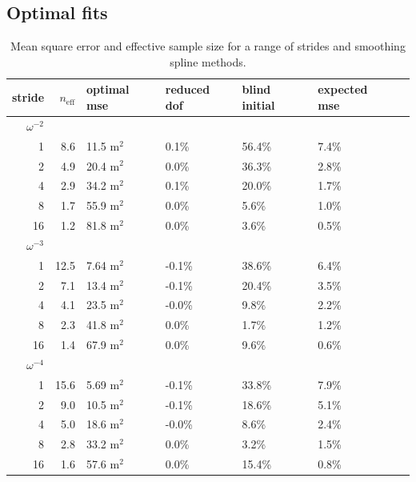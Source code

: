 \documentclass{ametsoc}
\begin{document}
\subsection{Optimal fits} \label{optimal_fits}
\begin{table}[ht]
\caption{Mean square error and effective sample size for a range of strides and smoothing spline methods. 
}
\label{fit_results_gaussian}
\centering
\begin{tabular}{r r p{1cm} | p{1cm}p{1cm}p{1cm}p{1cm}} stride & $n_\textrm{eff}$ & optimal mse & reduced dof & blind initial & expected mse \\ \hline \hline 
$\omega^{-2}$ &&&&&  \\ \hline 
1 & 8.6 & 11.5 m$^2$ &  0.1\%  &  56.4\%  &  7.4\%  \\ 
2 & 4.9 & 20.4 m$^2$ &  0.0\%  &  36.3\%  &  2.8\%  \\ 
4 & 2.9 & 34.2 m$^2$ &  0.1\%  &  20.0\%  &  1.7\%  \\ 
8 & 1.7 & 55.9 m$^2$ &  0.0\%  &  5.6\%  &  1.0\%  \\ 
16 & 1.2 & 81.8 m$^2$ &  0.0\%  &  3.6\%  &  0.5\%  \\ 
$\omega^{-3}$ &&&&&  \\ \hline 
1 & 12.5 & 7.64 m$^2$ &  -0.1\%  &  38.6\%  &  6.4\%  \\ 
2 & 7.1 & 13.4 m$^2$ &  -0.1\%  &  20.4\%  &  3.5\%  \\ 
4 & 4.1 & 23.5 m$^2$ &  -0.0\%  &  9.8\%  &  2.2\%  \\ 
8 & 2.3 & 41.8 m$^2$ &  0.0\%  &  1.7\%  &  1.2\%  \\ 
16 & 1.4 & 67.9 m$^2$ &  0.0\%  &  9.6\%  &  0.6\%  \\ 
$\omega^{-4}$ &&&&&  \\ \hline 
1 & 15.6 & 5.69 m$^2$ &  -0.1\%  &  33.8\%  &  7.9\%  \\ 
2 & 9.0 & 10.5 m$^2$ &  -0.1\%  &  18.6\%  &  5.1\%  \\ 
4 & 5.0 & 18.6 m$^2$ &  -0.0\%  &  8.6\%  &  2.4\%  \\ 
8 & 2.8 & 33.2 m$^2$ &  0.0\%  &  3.2\%  &  1.5\%  \\ 
16 & 1.6 & 57.6 m$^2$ &  0.0\%  &  15.4\%  &  0.8\%  \\ 
\end{tabular} 
\end{table}
\end{document}
